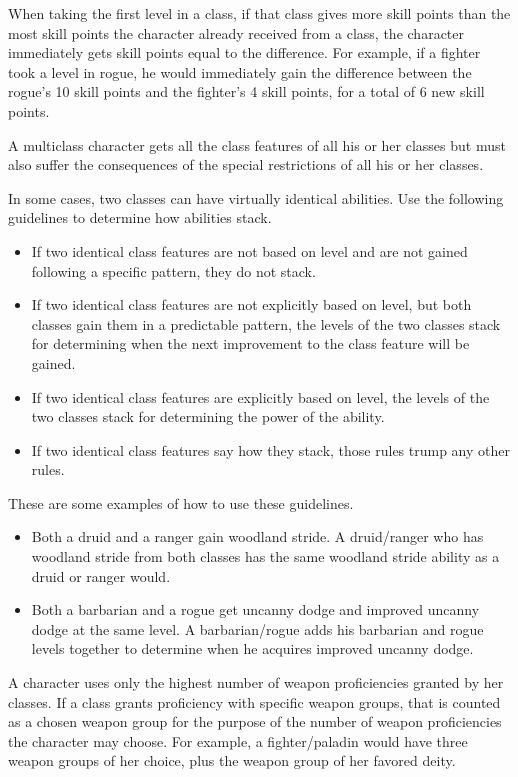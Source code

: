 When taking the first level in a class, if that class gives more skill points than the most skill points the character already received from a class, the character immediately gets skill points equal to the difference.
For example, if a fighter took a level in rogue, he would immediately gain the difference between the rogue's 10 skill points and the fighter's 4 skill points, for a total of 6 new skill points.

A multiclass character gets all the class features
of all his or her classes but must also suffer the consequences of the
special restrictions of all his or her classes.

\par In some cases, two classes can have virtually identical abilities.
Use the following guidelines to determine how abilities stack.
\begin{itemize}
    \item If two identical class features are not based on level and are not gained following a specific pattern, they do not stack.
    \item If two identical class features are not explicitly based on level, but both classes gain them in a predictable pattern, the levels of the two classes stack for determining when the next improvement to the class feature will be gained.
    \item If two identical class features are explicitly based on level, the levels of the two classes stack for determining the power of the ability.
    \item If two identical class features say how they stack, those rules trump any other rules.
\end{itemize}
These are some examples of how to use these guidelines.
\begin{itemize}
    \item Both a druid and a ranger gain woodland stride.
        A druid/ranger who has woodland stride from both classes has the same woodland stride ability as a druid or ranger would.
    \item Both a barbarian and a rogue get uncanny dodge and improved uncanny dodge at the same level.
        A barbarian/rogue adds his barbarian and rogue levels together to determine when he acquires improved uncanny dodge.
\end{itemize}

A character uses only the highest number of weapon proficiencies granted by her classes.
If a class grants proficiency with specific weapon groups, that is counted as a chosen weapon group for the purpose of the number of weapon proficiencies the character may choose.
For example, a fighter/paladin would have three weapon groups of her choice, plus the weapon group of her favored deity.

